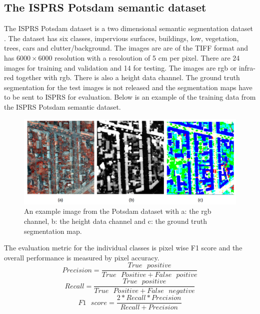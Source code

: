 \documentclass{kththesis}
\begin{document}
\subsection{The ISPRS Potsdam semantic dataset}
The ISPRS Potsdam dataset is a two dimensional semantic segmentation
dataset \cite{noauthor_2d_nodate}. The dataset has six classes, impervious surfaces, buildings, low, vegetation, trees, cars and clutter/background. The images are are of the TIFF format and has $6000 \times 6000$ resolution with a resoloution of 5 cm per pixel. There are 24 images for training
and validation and 14 for testing. The images are rgb or infra-red together
with rgb. There is also a height data channel. The ground truth segmentation for the test images is not released and the segmentation maps have to be sent to ISPRS for evaluation. Below is an example of the training data from the ISPRS Potsdam semantic dataset.
\begin{center}
\begin{figure}[H]
      \includegraphics[scale=0.25]{potsdam}
  \caption{An example image from the Potsdam dataset with a: the rgb
channel, b: the height data channel and c: the ground truth segmentation
map.}
\end{figure}
\end{center}
The evaluation metric for the individual classes is pixel wise F1 score and the
overall performance is measured by pixel accuracy.
\begin{equation}\label{eq:precision}
Precision=\frac{True\textit{ }positive}{True\textit{ }Positive+False\textit{ }poitive}
\end{equation}
\begin{equation}\label{eq:recall}
Recall=\frac{True\textit{ }positive}{True\textit{ }Positive+False\textit{ }negative}
\end{equation}
\begin{equation}\label{eq:f1}
F1\textit{ }score=\frac{2*Recall*Precision}{Recall+Precision}
\end{equation}
\end{document}

